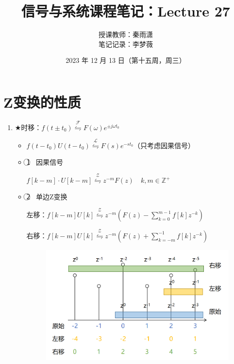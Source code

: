 \documentclass[UTF8]{ctexart}
\begin{document}
\title{信号与系统课程笔记：Lecture 27}
\author{授课教师：秦雨潇 \\
        笔记记录：李梦薇}
\date{2023 年 12 月 13 日（第十五周，周三）}
\maketitle

\section{Z变换的性质}
\begin{enumerate}[label=(\arabic*),itemindent=0pt,labelindent=\parindent,labelwidth=2em,labelsep=5pt,leftmargin=*]
  \item $\bigstar$时移：$f(t\pm t_0)\stackrel{\mathscr{F}}{\leftrightharpoons}F(\omega)e^{\pm j\omega t_0}$ \par
        \begin{itemize}[label=,left=3.8em]
          \item $f(t-t_0)U(t-t_0)\stackrel{\mathscr{L}}{\leftrightharpoons}F(s)e^{-st_0}$（只考虑因果信号）
          \item \textcircled{1} \ 因果信号 \par
                \quad $f[k-m]\cdot U[k-m]\stackrel{\mathscr{Z}}{\leftrightharpoons}z^{-m}F(z) \quad k,m\in{\mathbb{Z^+}}$
          \item \textcircled{2} \ 单边Z变换 \par
                \quad 左移：$f[k-m]U[k]\stackrel{\mathscr{Z}}{\leftrightharpoons}z^{-m}(F(z)-\sum_{k=0}^{m-1}f[k]z^{-k})$ \par
                \quad 右移：$f[k-m]U[k]\stackrel{\mathscr{Z}}{\leftrightharpoons}z^{-m}(F(z)+\sum_{k=-m}^{-1}f[k]z^{-k})$ \par
                \begin{figure}[h]
                  \centering
                  \includegraphics[scale=0.35]{Z变换时移.png}

\end{figure}
\end{itemize}
\end{enumerate}
\end{document}
